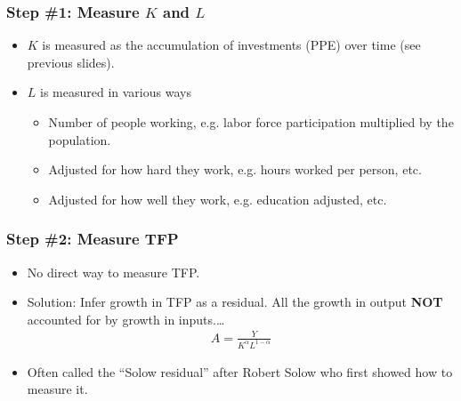\documentclass[handout]{beamer}
\begin{document}
\begin{frame}[t]
\frametitle{Step \#1: Measure $K$ and $L$}
\begin{itemize}
\item $K$ is measured as the accumulation of investments (PPE) over time (see previous slides).
\bigskip
\item $L$ is measured in various ways
\begin{itemize}
\medskip
\item Number of people working, e.g. labor force participation multiplied by the population.
\medskip
\item Adjusted for how hard they work, e.g. hours worked per person, etc.
\medskip
\item Adjusted for how well they work, e.g. education adjusted, etc.
\end{itemize}
\end{itemize}
\end{frame}


\begin{frame}[t]
\frametitle{Step \#2: Measure TFP}
\begin{itemize}
\item No direct way to measure TFP.
\bigskip
\item Solution: Infer growth in TFP as a residual. All the growth in output \textbf{NOT} accounted for by growth in inputs.\ldots
\begin{eqnarray*}
A = \frac{Y }{K^{\alpha}L^{1-\alpha}}
\end{eqnarray*}
\bigskip
\item Often called the ``Solow residual'' after Robert Solow who first showed how to measure it.
\end{itemize}
\end{frame}

\end{document}
